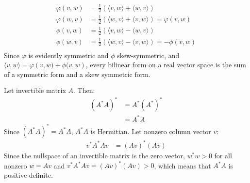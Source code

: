 \documentclass{article}
\begin{document}
\begin{equation}
    \begin{split}
        \varphi\left(v, w\right) & = \frac{1}{2}\left(\langle v, w \rangle + \langle w, v \rangle\right) \\
        \varphi\left(w, v\right) & = \frac{1}{2}\left(\langle  w, v \rangle + \langle v, w  \rangle\right) = \varphi\left(v, w\right) \\
        \phi\left(v, w\right) & = \frac{1}{2}\left(\langle  v, w \rangle - \langle w, v  \rangle\right) \\
        \phi\left(w, v\right) & = \frac{1}{2}\left(\langle  w, v \rangle - \langle v, w  \rangle\right) = -\phi\left(v, w\right) \\
    \end{split}
\end{equation}
Since $\varphi$ is evidently symmetric and $\phi$ skew-symmetric, and $\langle v, w\rangle = \varphi\left(v, w) + \phi(v, w\right)$, every bilinear form on a real vector space is the sum of a symmetric form and a skew symmetric form.

\clearpage

Let invertible matrix $A$. Then:
\begin{equation}
    \begin{split}
        \left(A^*A\right)^* & = A^*\left(A^*\right)^* \\
        & = A^*A
    \end{split}
\end{equation}
Since $\left(A^*A\right)^* = A^*A$, $A^*A$ is Hermitian. Let nonzero column vector $v$:
\begin{equation}
    \begin{split}
        v^*A^*Av & = \left(Av\right)^*\left(Av\right)
    \end{split}
\end{equation}
Since the nullspace of an invertible matrix is the zero vector, $w^*w > 0$ for all nonzero $w = Av$ and $v^*A^*Av = \left(Av\right)^*\left(Av\right) > 0$, which means that $A^*A$ is positive definite.

\clearpage
\end{document}
